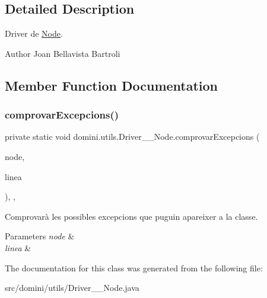 \subsection{Detailed Description}
Driver de \hyperlink{classdomini_1_1utils_1_1Node}{Node}. 

\begin{DoxyAuthor}{Author}
Joan Bellavista Bartroli 
\end{DoxyAuthor}


\subsection{Member Function Documentation}
\mbox{\label{classdomini_1_1utils_1_1Driver____Node_a9fdd311953250227bb70d67cbf20bbb4}} 
\subsubsection{\texorpdfstring{comprovar\+Excepcions()}{comprovarExcepcions()}}
{\footnotesize\ttfamily private static void domini.\+utils.\+Driver\+\_\+\+\_\+\+Node.\+comprovar\+Excepcions (\begin{DoxyParamCaption}\item[{\hyperlink{classdomini_1_1utils_1_1Node}{Node}}]{node,  }\item[{String}]{linea }\end{DoxyParamCaption})\hspace{0.3cm}{\ttfamily [inline]}, {\ttfamily [static]}, {\ttfamily [private]}}



Comprovarà les possibles excepcions que puguin apareixer a la classe. 


\begin{DoxyParams}{Parameters}
{\em node} & \\
\hline
{\em linea} & \\
\hline
\end{DoxyParams}


The documentation for this class was generated from the following file\+:\begin{DoxyCompactItemize}
\item 
src/domini/utils/Driver\+\_\+\+\_\+\+Node.\+java\end{DoxyCompactItemize}
